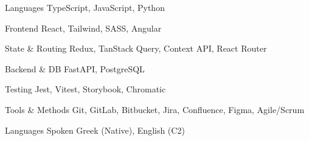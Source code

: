 

\begin{cvskills}

  \cvskill
    {Languages} %
    {TypeScript, JavaScript, Python} %

  \cvskill
    {Frontend} %
    {React, Tailwind, SASS, Angular} %

  \cvskill
    {State \& Routing} %
    {Redux, TanStack Query, Context API, React Router} %

  \cvskill
    {Backend \& DB} %
    {FastAPI, PostgreSQL} %

  \cvskill
    {Testing} %
    {Jest, Vitest, Storybook, Chromatic} %

  \cvskill
    {Tools \& Methods} %
    {Git, GitLab, Bitbucket, Jira, Confluence, Figma, Agile/Scrum} %

  \cvskill
    {Languages Spoken} %
    {Greek (Native), English (C2)} %

\end{cvskills}